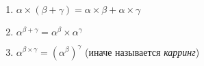 \documentclass[10pt,a4paper,oneside]{article}
\begin{document}
\begin{enumerate}
\begin{enumerate}
\item $\alpha \times (\beta+\gamma) = \alpha\times\beta + \alpha\times\gamma$
\item $\alpha ^ {\beta + \gamma} = \alpha ^ \beta \times \alpha ^ \gamma$
\item $\alpha ^ {\beta \times \gamma} = \left(\alpha ^ \beta\right) ^ \gamma$ (иначе называется \emph{карринг})
\end{enumerate}

\end{enumerate}
\end{document}

